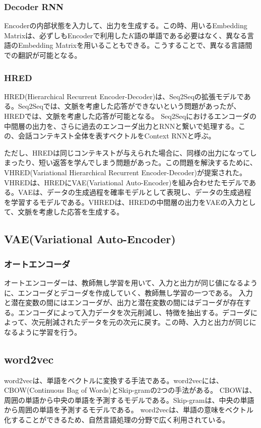 \documentclass{ltjsarticle}
\begin{document}
\subsubsection{Decoder RNN}
Encoderの内部状態を入力して、出力を生成する。この時、用いるEmbedding Matrixは、必ずしもEncoderで利用した$K$語の単語である必要はなく、異なる言語のEmbedding Matrixを用いることもできる。こうすることで、異なる言語間での翻訳が可能となる。

\subsubsection{HRED}
HRED(Hierarchical Recurrent Encoder-Decoder)は、Seq2Seqの拡張モデルである。Seq2Seqでは、文脈を考慮した応答ができないという問題があったが、HREDでは、文脈を考慮した応答が可能となる。
Seq2Seqにおけるエンコーダの中間層の出力を、さらに過去のエンコーダ出力とRNNと繋いで処理する。この、会話コンテキスト全体を表すベクトルをContext RNNと呼ぶ。
\par
ただし、HREDは同じコンテキストが与えられた場合に、同様の出力になってしまったり、短い返答を学んでしまう問題があった。この問題を解決するために、VHRED(Variational Hierarchical Recurrent Encoder-Decoder)が提案された。VHREDは、HREDにVAE(Variational Auto-Encoder)を組み合わせたモデルである。VAEは、データの生成過程を確率モデルとして表現し、データの生成過程を学習するモデルである。VHREDは、HREDの中間層の出力をVAEの入力として、文脈を考慮した応答を生成する。

\subsection{VAE(Variational Auto-Encoder)}
\subsubsection{オートエンコーダ}
オートエンコーダーは、教師無し学習を用いて、入力と出力が同じ値になるように、エンコーダとデコーダを作成していく、教師無し学習の一つである。
入力と潜在変数の間にはエンコーダが、出力と潜在変数の間にはデコーダが存在する。エンコーダによって入力データを次元削減し、特徴を抽出する。デコーダによって、次元削減されたデータを元の次元に戻す。この時、入力と出力が同じになるように学習を行う。

\subsection{word2vec}
word2vecは、単語をベクトルに変換する手法である。word2vecには、CBOW(Continuous Bag of Words)とSkip-gramの2つの手法がある。
CBOWは、周囲の単語から中央の単語を予測するモデルである。Skip-gramは、中央の単語から周囲の単語を予測するモデルである。
word2vecは、単語の意味をベクトル化することができるため、自然言語処理の分野で広く利用されている。
\end{document}
